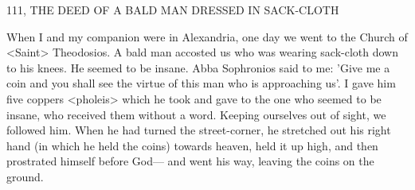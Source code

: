 111, THE DEED OF A BALD MAN
DRESSED IN SACK-CLOTH

When I and my companion were in Alexandria, one day we went to
the Church of <Saint> Theodosios. A bald man accosted us who
was wearing sack-cloth down to his knees. He seemed to be insane.
Abba Sophronios said to me: 'Give me a coin and you shall see the
virtue of this man who is approaching us'. I gave him five coppers
<pholeis> which he took and gave to the one who seemed to be
insane, who received them without a word. Keeping ourselves out
of sight, we followed him. When he had turned the street-corner, he
stretched out his right hand (in which he held the coins) towards
heaven, held it up high, and then prostrated himself before God—
and went his way, leaving the coins on the ground.

